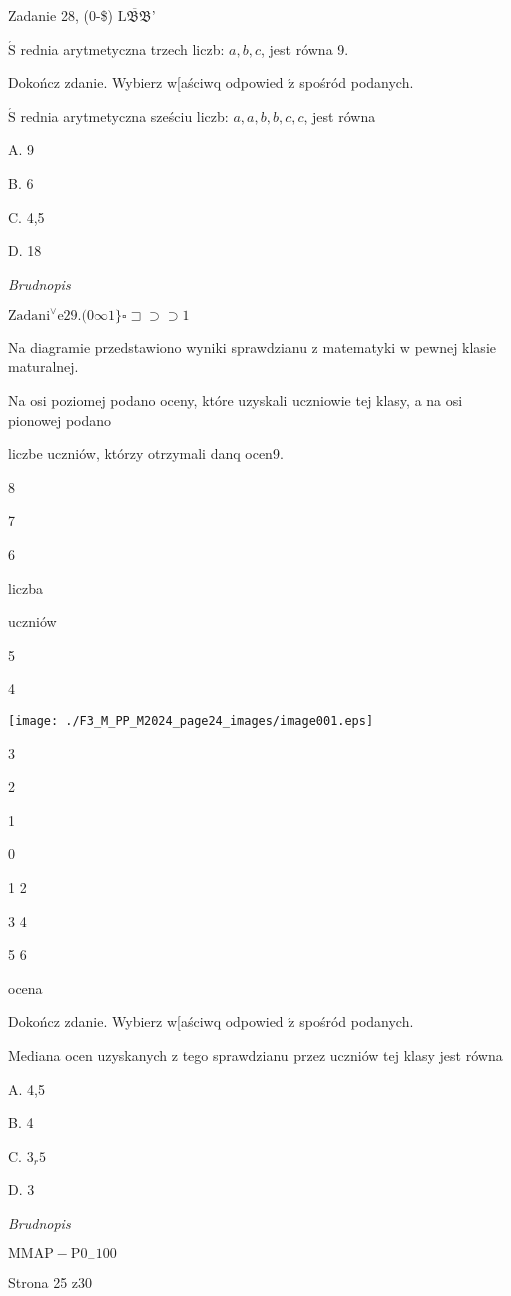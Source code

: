 \documentclass[a4paper,12pt]{article}
\begin{document}
Zadanie 28, (0-{\$}) $\overline{\mathrm{L}\mathfrak{B}\mathfrak{B}}$'

$\acute{\mathrm{S}}$ rednia arytmetyczna trzech liczb: $a, b, c$, jest równa 9.

Dokończ zdanie. Wybierz w[aściwq odpowied $\acute{\mathrm{z}}$ spośród podanych.

$\acute{\mathrm{S}}$ rednia arytmetyczna sześciu liczb: $a, a, b, b, c, c$, jest równa

A. 9

B. 6

C. 4,5

D. 18

{\it Brudnopis}

$\mathrm{Z}\mathrm{a}\mathrm{d}\mathrm{a}\mathrm{n}\mathrm{i}^{\vee}\mathrm{e}29. (0\infty 1\} \square \sqsupset\supset\supset 1$

Na diagramie przedstawiono wyniki sprawdzianu z matematyki w pewnej klasie maturalnej.

Na osi poziomej podano oceny, które uzyskali uczniowie tej klasy, a na osi pionowej podano

liczbe uczniów, którzy otrzymali danq ocen9.

8

7

6

liczba

uczniów

5

4
\begin{center}
\texttt{[image: ./F3\_M\_PP\_M2024\_page24\_images/image001.eps]}
\end{center}
3

2

1

0

1 2

3 4

5 6

ocena

Dokończ zdanie. Wybierz w[aściwq odpowied $\acute{\mathrm{z}}$ spośród podanych.

Mediana ocen uzyskanych z tego sprawdzianu przez uczniów tej klasy jest równa

A. 4,5

B. 4

C. $3_{r}5$

D. 3

{\it Brudnopis}

$\mathrm{M}\mathrm{M}\mathrm{A}\mathrm{P}-\mathrm{P}0_{-}100$

Strona 25 z30
\end{document}
